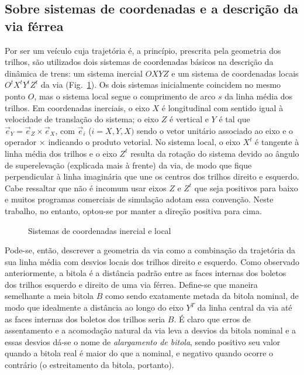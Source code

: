 \subsection{Sobre sistemas de coordenadas e a descrição da via férrea}
Por ser um veículo cuja trajetória é, a princípio, prescrita pela geometria dos trilhos, são utilizados dois sistemas de coordenadas básicos na descrição da dinâmica de trens: um sistema inercial $OXYZ$ e um sistema de coordenadas locais $O^tX^tY^tZ^t$ da via (Fig.~\ref{fig:trilhos}). Os dois sistemas inicialmente coincidem no mesmo ponto $O$, mas o sistema local segue o comprimento de arco $s$ da linha média dos trilhos. Em coordenadas inerciais, o eixo $X$ é longitudinal com sentido igual à velocidade de translação do sistema; o eixo $Z$ é vertical e $Y$ é tal que $\vec{e}_Y = \vec{e}_Z \times \vec{e}_X$, com $\vec{e}_i$ ($i=X,Y,X)$ sendo o vetor unitário associado ao eixo e o operador $\times$ indicando o produto vetorial. No sistema local, o eixo $X^t$ é tangente à linha média dos trilhos e o eixo $Z^t$ resulta da rotação do sistema devido ao ângulo de superelevação (explicada mais à frente) da via, de modo que fique perpendicular à linha imaginária que une os centros dos trilhos direito e esquerdo. Cabe ressaltar que não é incomum usar eixos $Z$ e $Z^t$ que seja positivos para baixo e muitos programas comerciais de simulação adotam essa convenção. Neste trabalho, no entanto, optou-se por manter a direção positiva para cima.

\begin{figure}
 \centering
 \caption{Sistemas de coordenadas inercial e local}
 \label{fig:trilhos}
\end{figure}

Pode-se, então, descrever a geometria da via como a combinação da trajetória da sua linha média com desvios locais dos trilhos direito e esquerdo. Como observado anteriormente, a bitola é a distância padrão entre as faces internas dos boletos dos trilhos esquerdo e direito de uma via férrea. Define-se que maneira semelhante a meia bitola $B$ como sendo exatamente metada da bitola nominal, de modo que idealmente a distância ao longo do eixo $Y^T$ da linha central da via até as faces internas dos boletos dos trilhos seria $B$. É claro que erros de assentamento e a acomodação natural da via leva a desvios da bitola nominal e a essas desvios dá-se o nome de \textit{alargamento de bitola}, sendo positivo seu valor quando a bitola real é maior do que a nominal, e negativo quando ocorre o contrário (o estreitamento da bitola, portanto).


